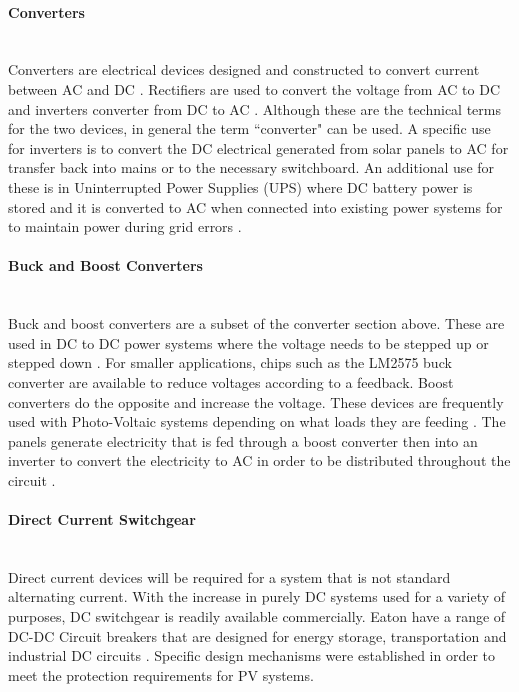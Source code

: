 \paragraph{Converters}
~\\
Converters are electrical devices designed and constructed to convert current between AC and DC \cite{website:ConvVsInverter}. Rectifiers are used to convert the voltage from AC to DC and inverters converter from DC to AC \cite{website:ConvVsInverter}. Although these are the technical terms for the two devices, in general the term ``converter" can be used. A specific use for inverters is to convert the DC electrical generated from solar panels to AC for transfer back into mains or to the necessary switchboard. An additional use for these is in Uninterrupted Power Supplies (UPS) where DC battery power is stored and it is converted to AC when connected into existing power systems for to maintain power during grid errors \cite{website:ConvVsInverter}.

\paragraph{Buck and Boost Converters}
~\\
Buck and boost converters are a subset of the converter section above. These are used in DC to DC power systems where the voltage needs to be stepped up or stepped down \cite{textbook:Abu-Rub2014}. For smaller applications, chips such as the LM2575 buck converter are available to reduce voltages according to a feedback. Boost converters do the opposite and increase the voltage. These devices are frequently used with Photo-Voltaic systems depending on what loads they are feeding \cite{textbook:Abu-Rub2014}. The panels generate electricity that is fed through a boost converter then into an inverter to convert the electricity to AC in order to be distributed throughout the circuit \cite{textbook:Abu-Rub2014}.  

\paragraph{Direct Current Switchgear}
~\\
Direct current devices will be required for a system that is not standard alternating current. With the increase in purely DC systems used for a variety of purposes, DC switchgear is readily available commercially. Eaton have a range of DC-DC Circuit breakers that are designed for energy storage, transportation and industrial DC circuits \cite{website:Eaton1}. Specific design mechanisms were established in order to meet the protection requirements for PV systems. 
\newline

